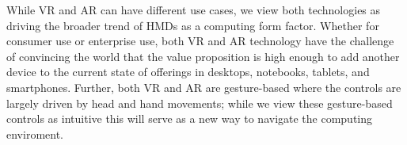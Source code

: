 \documentclass[preprint,12pt]{elsarticle}
\begin{document}


While VR and AR can have different use cases, we view both technologies as driving the broader trend of HMDs as a computing form factor. Whether for consumer use or enterprise use, both VR and AR technology have the challenge of convincing the world that the value proposition is high enough to add another device to the current state of offerings in desktops, notebooks, tablets, and smartphones. Further, both VR and AR are gesture-based where the controls are largely driven by head and hand movements; while we view these gesture-based controls as intuitive this will serve as a new way to navigate the computing enviroment.
\end{document}
